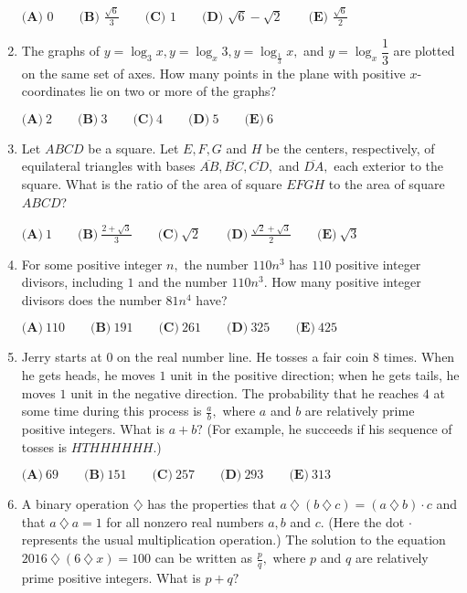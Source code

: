 \documentclass{article}
\begin{document}
\begin{enumerate}[label=\arabic*., itemsep=0.5em]
$\textbf{(A) } 0\qquad \textbf{(B) } \frac{\sqrt{6}}{3}\qquad\textbf{(C) } 1\qquad\textbf{(D) } \sqrt{6}-\sqrt{2}\qquad\textbf{(E) }\frac{\sqrt{6}}{2}$\par \vspace{0.5em}\item The graphs of $y=\log_3 x, y=\log_x 3, y=\log_\frac{1}{3} x,$ and $y=\log_x \dfrac{1}{3}$ are plotted on the same set of axes. How many points in the plane with positive $x$-coordinates lie on two or more of the graphs? 

$\textbf{(A)}\ 2\qquad\textbf{(B)}\ 3\qquad\textbf{(C)}\ 4\qquad\textbf{(D)}\ 5\qquad\textbf{(E)}\ 6$\par \vspace{0.5em}\item Let $ABCD$ be a square. Let $E, F, G$ and $H$ be the centers, respectively, of equilateral triangles with bases $\overline{AB}, \overline{BC}, \overline{CD},$ and $\overline{DA},$ each exterior to the square. What is the ratio of the area of square $EFGH$ to the area of square $ABCD$? 

$\textbf{(A)}\ 1\qquad\textbf{(B)}\ \frac{2+\sqrt{3}}{3} \qquad\textbf{(C)}\ \sqrt{2} \qquad\textbf{(D)}\ \frac{\sqrt{2}+\sqrt{3}}{2} \qquad\textbf{(E)}\ \sqrt{3}$\par \vspace{0.5em}\item For some positive integer $n,$ the number $110n^3$ has $110$ positive integer divisors, including $1$ and the number $110n^3.$ How many positive integer divisors does the number $81n^4$ have? 

$\textbf{(A)}\ 110\qquad\textbf{(B)}\ 191\qquad\textbf{(C)}\ 261\qquad\textbf{(D)}\ 325\qquad\textbf{(E)}\ 425$\par \vspace{0.5em}\item Jerry starts at $0$ on the real number line. He tosses a fair coin $8$ times. When he gets heads, he moves $1$ unit in the positive direction; when he gets tails, he moves $1$ unit in the negative direction. The probability that he reaches $4$ at some time during this process is $\frac{a}{b},$ where $a$ and $b$ are relatively prime positive integers. What is $a + b?$ (For example, he succeeds if his sequence of tosses is $HTHHHHHH.$)

$\textbf{(A)}\ 69\qquad\textbf{(B)}\ 151\qquad\textbf{(C)}\ 257\qquad\textbf{(D)}\ 293\qquad\textbf{(E)}\ 313$\par \vspace{0.5em}\item A binary operation $\diamondsuit $ has the properties that $a\ \diamondsuit\ (b\ \diamondsuit\ c) = (a\ \diamondsuit\ b)\cdot c$ and that $a\ \diamondsuit\ a = 1$ for all nonzero real numbers $a, b$ and $c.$ (Here the dot  $\cdot$  represents the usual multiplication operation.) The solution to the equation $2016\ \diamondsuit\ (6\ \diamondsuit\ x) = 100$ can be written as $\frac{p}{q},$ where $p$ and $q$ are relatively prime positive integers. What is $p + q?$ 


\end{enumerate}
\end{document}
